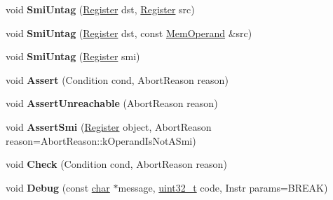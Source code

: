 \begin{DoxyCompactItemize}
void {\bfseries Smi\+Untag} (\mbox{\hyperlink{classv8_1_1internal_1_1Register}{Register}} dst, \mbox{\hyperlink{classv8_1_1internal_1_1Register}{Register}} src)
\item 
\mbox{\label{classv8_1_1internal_1_1TurboAssembler_aac3d9d6447c1f2d2b7192d91bc082839}} 
void {\bfseries Smi\+Untag} (\mbox{\hyperlink{classv8_1_1internal_1_1Register}{Register}} dst, const \mbox{\hyperlink{classv8_1_1internal_1_1MemOperand}{Mem\+Operand}} \&src)
\item 
\mbox{\label{classv8_1_1internal_1_1TurboAssembler_acebec6ac2bfcbc997d3e8cfcc8f8e566}} 
void {\bfseries Smi\+Untag} (\mbox{\hyperlink{classv8_1_1internal_1_1Register}{Register}} smi)
\item 
\mbox{\label{classv8_1_1internal_1_1TurboAssembler_a4f3d67b69b1f6e3ed015bf0d98b4464c}} 
void {\bfseries Assert} (Condition cond, Abort\+Reason reason)
\item 
\mbox{\label{classv8_1_1internal_1_1TurboAssembler_a36d9ec6042f44ed7f0c27e283934d359}} 
void {\bfseries Assert\+Unreachable} (Abort\+Reason reason)
\item 
\mbox{\label{classv8_1_1internal_1_1TurboAssembler_a802f680e4a48ddb5d36a69ee1b4dffad}} 
void {\bfseries Assert\+Smi} (\mbox{\hyperlink{classv8_1_1internal_1_1Register}{Register}} object, Abort\+Reason reason=Abort\+Reason\+::k\+Operand\+Is\+Not\+A\+Smi)
\item 
\mbox{\label{classv8_1_1internal_1_1TurboAssembler_a158fac24257ccf8960ffa9cddc555507}} 
void {\bfseries Check} (Condition cond, Abort\+Reason reason)
\item 
\mbox{\label{classv8_1_1internal_1_1TurboAssembler_ac384a5e1ece8afe7b39f461b65870b2d}} 
void {\bfseries Debug} (const \mbox{\hyperlink{classchar}{char}} $\ast$message, \mbox{\hyperlink{classuint32__t}{uint32\+\_\+t}} code, Instr params=B\+R\+E\+AK)
\item 
\mbox{\label{classv8_1_1internal_1_1TurboAssembler_a714d3b6a967aed8110ff6170772850ec}} 

\end{DoxyCompactItemize}

